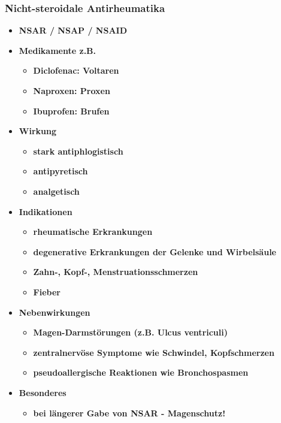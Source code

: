\subsubsection{Nicht-steroidale Antirheumatika}
	\begin{itemize}
		\item \textbf{NSAR / NSAP / NSAID}
		\item \textbf{Medikamente z.B.}
			\begin{itemize}
				\item \textbf{Diclofenac: Voltaren\textregistered}
				\item \textbf{Naproxen: Proxen\textregistered}
				\item \textbf{Ibuprofen: Brufen\textregistered}
			\end{itemize}
		\item \textbf{Wirkung}
			\begin{itemize}
				\item \textbf{stark antiphlogistisch}
				\item \textbf{antipyretisch}
				\item \textbf{analgetisch}
			\end{itemize}
		\item \textbf{Indikationen}
			\begin{itemize}
				\item \textbf{rheumatische Erkrankungen}
				\item \textbf{degenerative Erkrankungen der Gelenke und Wirbelsäule}
				\item \textbf{Zahn-, Kopf-, Menstruationsschmerzen}
				\item \textbf{Fieber}
			\end{itemize}
		\item \textbf{Nebenwirkungen}
			\begin{itemize}
				\item \textbf{Magen-Darmstörungen (z.B. Ulcus ventriculi)}
				\item \textbf{zentralnervöse Symptome wie Schwindel, Kopfschmerzen}
				\item \textbf{pseudoallergische Reaktionen wie Bronchospasmen}
			\end{itemize}
		\item \textbf{Besonderes}
			\begin{itemize}
				\item \textbf{bei längerer Gabe von NSAR - Magenschutz!}
			\end{itemize}
	\end{itemize}
		
